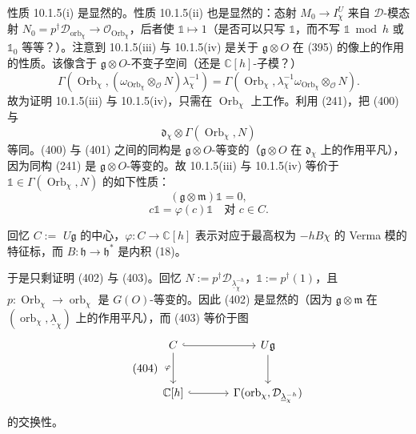 性质 10.1.5(i) 是显然的。性质 10.1.5(ii) 也是显然的：态射 $M_{0}\to I^{U}_{\chi}$ 来自 $\mathcal{D}$-模态射 $N_{0}=p^{\dagger}\mathcal{D}_{\operatorname{orb}_{\chi}}\to\mathcal{O}_{\operatorname{Orb}_{\chi}}$，后者使 $\mathbb{1}\mapsto 1$（是否可以只写 $\mathbb{1}$，而不写 $\mathbb{1}\bmod h$ 或 $\mathbb{1}_{0}$ 等等？）。注意到 10.1.5(iii) 与 10.1.5(iv) 是关于 $\mathfrak{g}\otimes O$ 在 (395) 的像上的作用的性质。该像含于 $\mathfrak{g}\otimes O$-不变子空间（还是 $\mathbb{C}[h]$-子模？）
\begin{equation}\tag{400}
\Gamma(\operatorname{Orb}_{\chi},(\omega_{\operatorname{Orb}_{\chi}}\otimes_{\mathcal{O}}N)\lambda_{\chi}^{-1})=\Gamma(\operatorname{Orb}_{\chi},\lambda_{\chi}^{-1}\omega_{\operatorname{Orb}_{\chi}}\otimes_{\mathcal{O}}N).
\end{equation}
故为证明 10.1.5(iii) 与 10.1.5(iv)，只需在 $\operatorname{Orb}_{\chi}$ 上工作。利用 (241)，把 (400) 与
\begin{equation}\tag{401}
\mathfrak{d}_{\chi}\otimes\Gamma(\operatorname{Orb}_{\chi},N)
\end{equation}
等同。(400) 与 (401) 之间的同构是 $\mathfrak{g}\otimes O$-等变的（$\mathfrak{g}\otimes O$ 在 $\mathfrak{d}_{\chi}$ 上的作用平凡），因为同构 (241) 是 $\mathfrak{g}\otimes O$-等变的。故 10.1.5(iii) 与 10.1.5(iv) 等价于 $\mathbb{1}\in\Gamma(\operatorname{Orb}_{\chi},N)$ 的如下性质：
\begin{equation}\tag{402}
(\mathfrak{g}\otimes\mathfrak{m})\mathbb{1}=0,
\end{equation}
\begin{equation}\tag{403}
c\mathbb{1}=\varphi(c)\mathbb{1}\quad\text{对 } c\in C.
\end{equation}

回忆 $C:=$ $U\mathfrak{g}$ 的中心，$\varphi:C\to\mathbb{C}[h]$ 表示对应于最高权为 $-hB\chi$ 的 Verma 模的特征标，而 $B:\mathfrak{h}\to\mathfrak{h}^{*}$ 是内积 (18)。

于是只剩证明 (402) 与 (403)。回忆 $N:=p^{\dagger}\mathcal{D}_{\underline{\lambda}_{\chi}^{-h}}$，$\mathbb{1}:=p^{\dagger}(1)$，且 $p:\operatorname{Orb}_{\chi}\to\operatorname{orb}_{\chi}$ 是 $G(O)$-等变的。因此 (402) 是显然的（因为 $\mathfrak{g}\otimes\mathfrak{m}$ 在 $(\operatorname{orb}_{\chi},\underline{\lambda}_{\chi})$ 上的作用平凡），而 (403) 等价于图
\begin{equation}\tag{404}
\begin{tikzcd}[row sep=2.6em,column sep=3.6em]
C \arrow[r, hook] \arrow[d, "\varphi"'] & U\mathfrak{g} \arrow[d] \\
\mathbb{C}[h] \arrow[r, hook] & \Gamma(\operatorname{orb}_{\chi},\mathcal{D}_{\underline{\lambda}_{\chi}^{-h}})
\end{tikzcd}
\end{equation}
的交换性。

